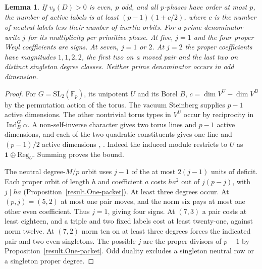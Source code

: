 \documentclass[11pt]{amsart}
\numberwithin{equation}{section}
\newtheorem{lemma}[theorem]{Lemma}
\theoremstyle{definition}
\theoremstyle{plain}
\begin{document}
\begin{lemma}\label{result:neutral-inertia}
If $v_p(D)>0$ is even, $p$ odd, and all $p$-phases have order at most
$p$, the number of active labels is at least $(p-1)(1+c/2)$, where
$c$ is the number of neutral labels less their number of inertia orbits.
For a prime denominator write $j$ for its multiplicity per primitive
phase. At five, $j=1$ and the four proper Weyl coefficients are signs.
At seven, $j=1$ or $2$. At $j=2$ the proper coefficients have magnitudes
$1,1,2,2$, the first two on a moved pair and the last two on distinct
singleton degree classes. Neither prime denominator occurs in odd
dimension.
\end{lemma}
\begin{proof}
For $G=\mathrm{SL}_2(\mathbb F_p)$, its unipotent $U$ and its Borel
$B$, $c=\dim V^U-\dim V^B$ by the permutation action of the torus.
The vacuum Steinberg supplies $p-1$ active dimensions. The other
nontrivial torus types in $V^U$ occur by reciprocity in
$\operatorname{Ind}_B^G\alpha$. A non-self-inverse character gives
two torus lines and $p-1$ active dimensions, and each of the two
quadratic constituents gives one line and $(p-1)/2$ active dimensions
\cite[Prop.~2.14]{PrasadSL}, \cite[Lem.~4.3]{Nevins}.
Indeed the induced module restricts to $U$ as
$\mathbf1\oplus\mathrm{Reg}_U$. Summing proves the bound.

The neutral degree-$M/p$ orbit uses $j-1$ of the at most $2(j-1)$
units of deficit. Each proper orbit of length $h$ and coefficient
$a$ costs $ha^2$ out of $j(p-j)$, with $j\mid ha$
(Proposition~\ref{result.One-packet}). At least three degrees occur.
At $(p,j)=(5,2)$ at most one pair moves, and the norm six pays at
most one other even coefficient. Thus $j=1$, giving four signs.
At $(7,3)$ a pair costs at least eighteen, and a triple and two
fixed labels cost at least twenty-one, against norm twelve. At
$(7,2)$ norm ten on at least three degrees forces the indicated
pair and two even singletons. The possible $j$ are the proper
divisors of $p-1$ by Proposition~\ref{result.One-packet}. Odd duality
excludes a singleton neutral row or a singleton proper degree.
\end{proof}
\end{document}
